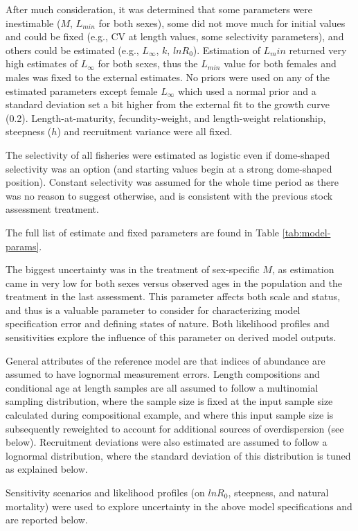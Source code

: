 \documentclass[11pt,
  letterpaper,
]{article}
\begin{document}
After much consideration, it was determined that some parameters were inestimable (\(M\), \(L_{min}\) for both sexes), some did not move much for initial values and could be fixed (e.g., CV at length values, some selectivity parameters), and others could be estimated (e.g., \(L_{\infty}\), \(k\), \(lnR_0\)). Estimation of \(L_min\) returned very high estimates of \(L_{\infty}\) for both sexes, thus the \(L_{min}\) value for both females and males was fixed to the external estimates. No priors were used on any of the estimated parameters except female \(L_{\infty}\) which used a normal prior and a standard deviation set a bit higher from the external fit to the growth curve (0.2). Length-at-maturity, fecundity-weight, and length-weight relationship, steepness (\(h\)) and recruitment variance were all fixed.

The selectivity of all fisheries were estimated as logistic even if dome-shaped selectivity was an option (and starting values begin at a strong dome-shaped position). Constant selectivity was assumed for the whole time period as there was no reason to suggest otherwise, and is consistent with the previous stock assessment treatment.

The full list of estimate and fixed parameters are found in Table \ref{tab:model-params}.

The biggest uncertainty was in the treatment of sex-specific \(M\), as estimation came in very low for both sexes versus observed ages in the population and the treatment in the last assessment. This parameter affects both scale and status, and thus is a valuable parameter to consider for characterizing model specification error and defining states of nature. Both likelihood profiles and sensitivities explore the influence of this parameter on derived model outputs.

General attributes of the reference model are that indices of abundance are assumed to have lognormal measurement errors. Length compositions and conditional age at length samples are all assumed to follow a multinomial sampling distribution, where the sample size is fixed at the input sample size calculated during compositional example, and where this input sample size is subsequently reweighted to account for additional sources of overdispersion (see below). Recruitment deviations were also estimated are assumed to follow a lognormal distribution, where the standard deviation of this distribution is tuned as explained below.

Sensitivity scenarios and likelihood profiles (on \(lnR_0\), steepness, and natural mortality) were used to explore uncertainty in the above model specifications and are reported below.
\end{document}
